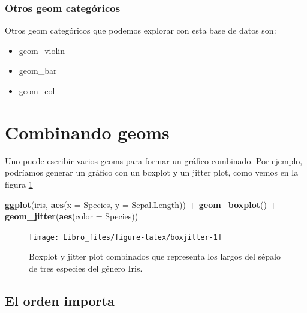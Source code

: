 \documentclass[]{book}
\newenvironment{Shaded}{\begin{snugshade}}{\end{snugshade}}
\newcommand{\DataTypeTok}[1]{\textcolor[rgb]{0.13,0.29,0.53}{#1}}
\newcommand{\KeywordTok}[1]{\textcolor[rgb]{0.13,0.29,0.53}{\textbf{#1}}}
\newcommand{\NormalTok}[1]{#1}
\newcommand{\OperatorTok}[1]{\textcolor[rgb]{0.81,0.36,0.00}{\textbf{#1}}}
\newcommand{\StringTok}[1]{\textcolor[rgb]{0.31,0.60,0.02}{#1}}
\providecommand{\tightlist}{%
  \setlength{\itemsep}{0pt}\setlength{\parskip}{0pt}}
\begin{document}
\hypertarget{otros-geom-categoricos}{%
\subsubsection{Otros geom categóricos}\label{otros-geom-categoricos}}

Otros geom categóricos que podemos explorar con esta base de datos son:

\begin{itemize}
\tightlist
\item
  geom\_violin
\item
  geom\_bar
\item
  geom\_col
\end{itemize}

\hypertarget{combinando-geoms}{%
\section{Combinando geoms}\label{combinando-geoms}}

Uno puede escribir varios geoms para formar un gráfico combinado. Por
ejemplo, podríamos generar un gráfico con un boxplot y un jitter plot,
como vemos en la figura \ref{fig:boxjitter}

\begin{Shaded}
\begin{Highlighting}[]
\KeywordTok{ggplot}\NormalTok{(iris, }\KeywordTok{aes}\NormalTok{(}\DataTypeTok{x =}\NormalTok{ Species, }\DataTypeTok{y =}\NormalTok{ Sepal.Length)) }\OperatorTok{+}\StringTok{ }\KeywordTok{geom_boxplot}\NormalTok{() }\OperatorTok{+}\StringTok{ }
\StringTok{    }\KeywordTok{geom_jitter}\NormalTok{(}\KeywordTok{aes}\NormalTok{(}\DataTypeTok{color =}\NormalTok{ Species))}
\end{Highlighting}
\end{Shaded}

\begin{figure}

{\centering \texttt{[image: Libro\_files/figure-latex/boxjitter-1]} 

}

\caption{Boxplot y jitter plot combinados que representa los largos del sépalo de tres especies del género Iris.}\label{fig:boxjitter}
\end{figure}

\hypertarget{el-orden-importa}{%
\subsection{El orden importa}\label{el-orden-importa}}
\end{document}
